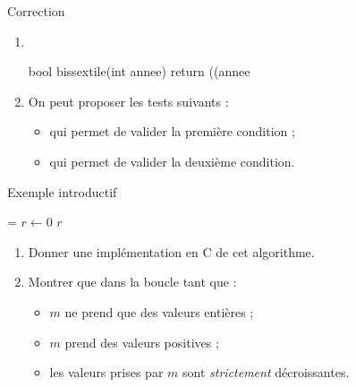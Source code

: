 \documentclass[10pt,french]{beamer}
\begin{document}
\begin{frame}[fragile]{\Ctitle}{\stitle}
\begin{exampleblock}{Correction}
	\begin{enumerate}
	\item<1-> \ \\
	\begin{langageC}
bool bissextile(int annee) {
	return ((annee %
}
	\end{langageC}
	\item<2-> On peut proposer les tests suivants :
	\begin{itemize}
		\item<3->  qui permet de valider la première condition ;
		\item<4->  qui permet de valider la deuxième condition.
	\end{itemize}
\end{enumerate}
\end{exampleblock}
\end{frame}

\begin{frame}[fragile]{\Ctitle}{\stitle}
	\begin{block}{Exemple introductif}
	\SetAlFnt{\small}
	\setlength{\algomargin}{8pt}
	\begin{algorithm}[H]
		\DontPrintSemicolon
		\caption{Multiplier sans utiliser {\tt *}}
		\everypar={\footnotesize \textcolor{gray}{\nl}}
		$r \leftarrow 0$\;
		\Return $r$
	  \end{algorithm}
	  \begin{enumerate}
	  \item<2-> Donner une implémentation en C de cet algorithme.
	  \item<3-> Montrer que dans la boucle \og tant que \fg{} :
	  \begin{itemize}
		\item<3-> $m$ ne prend que des valeurs entières ;
		\item<4-> $m$ prend des valeurs positives ;
		\item<5-> les valeurs prises par $m$ sont \textit{strictement} décroissantes.
	  \end{itemize}
	  \end{enumerate}
	\end{block}
\end{frame}
\end{document}
